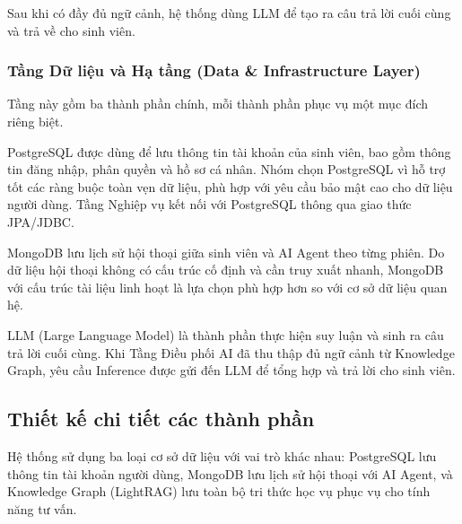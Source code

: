 Sau khi có đầy đủ ngữ cảnh, hệ thống dùng LLM để tạo ra câu trả lời cuối cùng và trả về cho sinh viên.

\subsubsection{Tầng Dữ liệu và Hạ tầng (Data \& Infrastructure Layer)}

Tầng này gồm ba thành phần chính, mỗi thành phần phục vụ một mục đích riêng biệt.

PostgreSQL được dùng để lưu thông tin tài khoản của sinh viên, bao gồm thông tin đăng nhập, phân quyền và hồ sơ cá nhân. Nhóm chọn PostgreSQL vì hỗ trợ tốt các ràng buộc toàn vẹn dữ liệu, phù hợp với yêu cầu bảo mật cao cho dữ liệu người dùng. Tầng Nghiệp vụ kết nối với PostgreSQL thông qua giao thức JPA/JDBC.

MongoDB lưu lịch sử hội thoại giữa sinh viên và AI Agent theo từng phiên. Do dữ liệu hội thoại không có cấu trúc cố định và cần truy xuất nhanh, MongoDB với cấu trúc tài liệu linh hoạt là lựa chọn phù hợp hơn so với cơ sở dữ liệu quan hệ.

LLM (Large Language Model) là thành phần thực hiện suy luận và sinh ra câu trả lời cuối cùng. Khi Tầng Điều phối AI đã thu thập đủ ngữ cảnh từ Knowledge Graph, yêu cầu Inference được gửi đến LLM để tổng hợp và trả lời cho sinh viên.

\subsection{Thiết kế chi tiết các thành phần}

Hệ thống sử dụng ba loại cơ sở dữ liệu với vai trò khác nhau: PostgreSQL lưu thông tin tài khoản người dùng, MongoDB lưu lịch sử hội thoại với AI Agent, và Knowledge Graph (LightRAG) lưu toàn bộ tri thức học vụ phục vụ cho tính năng tư vấn.


